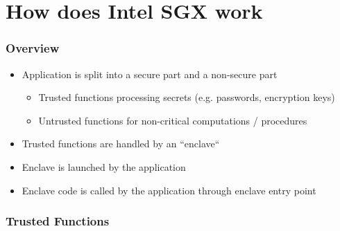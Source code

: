 \section{How does Intel SGX work}

\begin{frame}
    \frametitle{Overview}
    \begin{itemize}[<+->]
        \item Application is split into a secure part and a non-secure part
        \begin{itemize}
            \item Trusted functions processing secrets (e.g. passwords, encryption keys)
            \item Untrusted functions for non-critical computations / procedures
        \end{itemize}
        \item Trusted functions are handled by an ``enclave``
        \item Enclave is launched by the application
        \item Enclave code is called by the application through enclave entry point
    \end{itemize}
\end{frame}


\begin{frame}
    \frametitle{Trusted Functions}
    \begin{itemize}
    \end{itemize}
\end{frame}

